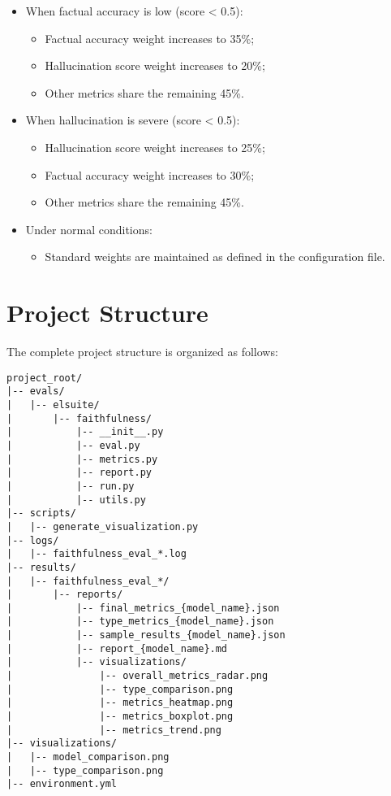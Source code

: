 \begin{itemize}
    \item When factual accuracy is low (score < 0.5):
    \begin{itemize}
        \item Factual accuracy weight increases to 35\%;
        \item Hallucination score weight increases to 20\%;
        \item Other metrics share the remaining 45\%.
    \end{itemize}
    
    \item When hallucination is severe (score < 0.5):
    \begin{itemize}
        \item Hallucination score weight increases to 25\%;
        \item Factual accuracy weight increases to 30\%;
        \item Other metrics share the remaining 45\%.
    \end{itemize}
    
    \item Under normal conditions:
    \begin{itemize}
        \item Standard weights are maintained as defined in the configuration file.
    \end{itemize}
\end{itemize}

\section{Project Structure}
The complete project structure is organized as follows:

\begin{lstlisting}[language=Text, breaklines=true, basicstyle=\ttfamily\scriptsize]
project_root/
|-- evals/
|   |-- elsuite/
|       |-- faithfulness/
|           |-- __init__.py
|           |-- eval.py
|           |-- metrics.py
|           |-- report.py
|           |-- run.py
|           |-- utils.py
|-- scripts/
|   |-- generate_visualization.py
|-- logs/
|   |-- faithfulness_eval_*.log
|-- results/
|   |-- faithfulness_eval_*/
|       |-- reports/
|           |-- final_metrics_{model_name}.json
|           |-- type_metrics_{model_name}.json
|           |-- sample_results_{model_name}.json
|           |-- report_{model_name}.md
|           |-- visualizations/
|               |-- overall_metrics_radar.png
|               |-- type_comparison.png
|               |-- metrics_heatmap.png
|               |-- metrics_boxplot.png
|               |-- metrics_trend.png
|-- visualizations/
|   |-- model_comparison.png
|   |-- type_comparison.png
|-- environment.yml
\end{lstlisting}
